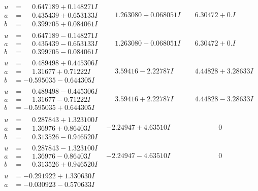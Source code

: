 \documentclass[1p]{elsarticle_modified}
\theoremstyle{definition}
\begin{document}
$$\begin{array}{c|c|c}
\begin{aligned}
u &= \phantom{-}0.647189 + 0.148271 I \\
a &= \phantom{-}0.435439 + 0.653133 I \\
b &= \phantom{-}0.399705 + 0.084061 I\end{aligned}
 & \phantom{-}1.263080 + 0.068051 I & \phantom{-}6.30472 + 0. I\phantom{ +0.000000I} \\ \hline\begin{aligned}
u &= \phantom{-}0.647189 - 0.148271 I \\
a &= \phantom{-}0.435439 - 0.653133 I \\
b &= \phantom{-}0.399705 - 0.084061 I\end{aligned}
 & \phantom{-}1.263080 - 0.068051 I & \phantom{-}6.30472 + 0. I\phantom{ +0.000000I} \\ \hline\begin{aligned}
u &= \phantom{-}0.489498 + 0.445306 I \\
a &= \phantom{-}1.31677 + 0.71222 I \\
b &= -0.595035 - 0.644305 I\end{aligned}
 & \phantom{-}3.59416 - 2.22787 I & \phantom{-}4.44828 + 3.28633 I \\ \hline\begin{aligned}
u &= \phantom{-}0.489498 - 0.445306 I \\
a &= \phantom{-}1.31677 - 0.71222 I \\
b &= -0.595035 + 0.644305 I\end{aligned}
 & \phantom{-}3.59416 + 2.22787 I & \phantom{-}4.44828 - 3.28633 I \\ \hline\begin{aligned}
u &= \phantom{-}0.287843 + 1.323100 I \\
a &= \phantom{-}1.36976 + 0.86403 I \\
b &= \phantom{-}0.313526 - 0.946520 I\end{aligned}
 & -2.24947 + 4.63510 I & \phantom{-0.000000 } 0 \\ \hline\begin{aligned}
u &= \phantom{-}0.287843 - 1.323100 I \\
a &= \phantom{-}1.36976 - 0.86403 I \\
b &= \phantom{-}0.313526 + 0.946520 I\end{aligned}
 & -2.24947 - 4.63510 I & \phantom{-0.000000 } 0 \\ \hline\begin{aligned}
u &= -0.291922 + 1.330630 I \\
a &= -0.030923 - 0.570633 I \\

\end{aligned}
\end{array}$$
\end{document}
